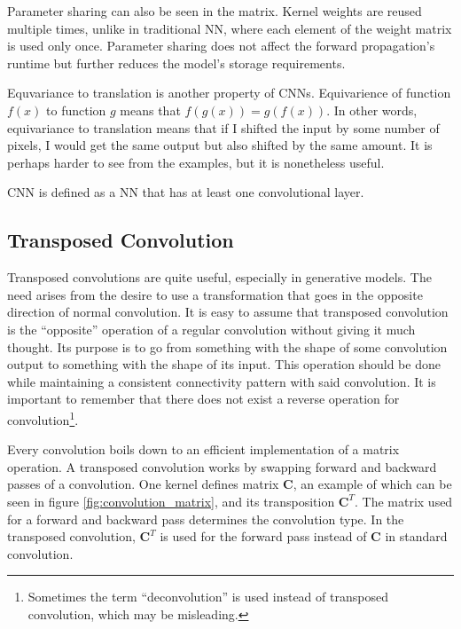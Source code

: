 Parameter sharing can also be seen in the matrix. Kernel weights are reused multiple times, unlike in traditional \gls{NN}, where each element of the weight matrix is used only once. Parameter sharing does not affect the forward propagation's runtime but further reduces the model's storage requirements.

Equvariance to translation is another property of \glspl{CNN}. Equivarience of function $f(x)$ to function $g$ means that $f\left(g(x)\right) = g\left(f\left(x\right)\right)$. In other words, equivariance to translation means that if I shifted the input by some number of pixels, I would get the same output but also shifted by the same amount. It is perhaps harder to see from the examples, but it is nonetheless useful. \cite[pg. 329-335]{deeplearningbook}

\gls{CNN} is defined as a \gls{NN} that has at least one convolutional layer.

\subsection{Transposed Convolution}
\label{subsec:transposed_convolution}

Transposed convolutions are quite useful, especially in generative models. The need arises from the desire to use a transformation that goes in the opposite direction of normal convolution. It is easy to assume that transposed convolution is the ``opposite'' operation of a regular convolution without giving it much thought. Its purpose is to go from something with the shape of some convolution output to something with the shape of its input. This operation should be done while maintaining a consistent connectivity pattern with said convolution. It is important to remember that there does not exist a reverse operation for convolution\footnote{Sometimes the term ``deconvolution'' is used instead of transposed convolution, which may be misleading.}. \cite{convolutionguide, deconvolutionbias}

Every convolution boils down to an efficient implementation of a matrix operation. A transposed convolution works by swapping forward and backward passes of a convolution. One kernel defines matrix $\mathbf C$, an example of which can be seen in figure \ref{fig:convolution_matrix}, and its transposition $\mathbf C^T$. The matrix used for a forward and backward pass determines the convolution type. In the transposed convolution, $\mathbf C^T$ is used for the forward pass instead of $\mathbf C$ in standard convolution.

